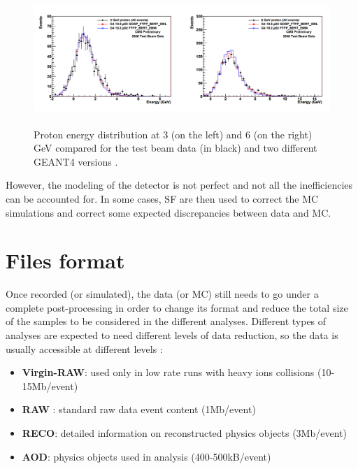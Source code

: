 \documentclass[a4paper, 10pt, openright]{report}
\begin{document}
\begin{figure}[htbp]
\begin{center}
\includegraphics[width=14cm, height=5cm]{figs/CMSGEANT.png}
\caption{Proton energy distribution at 3 (on the left) and 6 (on the right) GeV compared for the test beam data (in black) and two different GEANT4 versions \cite{GEANTComp}.}
\label{fig:CMSGEANT}
\end{center}
\end{figure}

However, the modeling of the detector is not perfect and not all the inefficiencies can be accounted for. In some cases, \ac{SF} are then used to correct the \ac{MC} simulations and correct some expected discrepancies between data and \ac{MC}.

\section{Files format} \label{section:Files}

Once recorded (or simulated), the data (or \ac{MC}) still needs to go under a complete post-processing in order to change its format and reduce the total size of the samples to be considered in the different analyses. Different types of analyses are expected to need different levels of data reduction, so the data is usually accessible at different levels \cite{nanoAOD}:

\begin{itemize}
\item \textbf{Virgin-RAW}: used only in low rate runs with heavy ions collisions (10-15Mb/event)
\item \textbf{RAW} : standard raw data event content (1Mb/event)
\item \textbf{RECO}: detailed information on reconstructed physics objects (3Mb/event)
\item \textbf{\ac{AOD}}: physics objects used in analysis (400-500kB/event)
\end{itemize}
\end{document}
